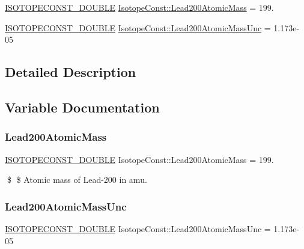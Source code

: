 \begin{DoxyCompactItemize}
\item 
\mbox{\hyperlink{group___isotope_const-_macros_ga8f45a7272ce02c0b4c65c44636ed719a}{I\+S\+O\+T\+O\+P\+E\+C\+O\+N\+S\+T\+\_\+\+D\+O\+U\+B\+LE}} \mbox{\hyperlink{group___isotope_const-_lead-_pb200_ga933e3948b76ac36aeda8444a6b076cfa}{Isotope\+Const\+::\+Lead200\+Atomic\+Mass}} = 199.
\item 
\mbox{\hyperlink{group___isotope_const-_macros_ga8f45a7272ce02c0b4c65c44636ed719a}{I\+S\+O\+T\+O\+P\+E\+C\+O\+N\+S\+T\+\_\+\+D\+O\+U\+B\+LE}} \mbox{\hyperlink{group___isotope_const-_lead-_pb200_gaf554846647b37135639dd9cd48b376ed}{Isotope\+Const\+::\+Lead200\+Atomic\+Mass\+Unc}} = 1.\+173e-\/05
\end{DoxyCompactItemize}


\subsection{Detailed Description}


\subsection{Variable Documentation}
\mbox{\label{group___isotope_const-_lead-_pb200_ga933e3948b76ac36aeda8444a6b076cfa}} 
\subsubsection{\texorpdfstring{Lead200\+Atomic\+Mass}{Lead200AtomicMass}}
{\footnotesize\ttfamily \mbox{\hyperlink{group___isotope_const-_macros_ga8f45a7272ce02c0b4c65c44636ed719a}{I\+S\+O\+T\+O\+P\+E\+C\+O\+N\+S\+T\+\_\+\+D\+O\+U\+B\+LE}} Isotope\+Const\+::\+Lead200\+Atomic\+Mass = 199.}

\$ \$ Atomic mass of Lead-\/200 in amu. \mbox{\label{group___isotope_const-_lead-_pb200_gaf554846647b37135639dd9cd48b376ed}} 
\subsubsection{\texorpdfstring{Lead200\+Atomic\+Mass\+Unc}{Lead200AtomicMassUnc}}
{\footnotesize\ttfamily \mbox{\hyperlink{group___isotope_const-_macros_ga8f45a7272ce02c0b4c65c44636ed719a}{I\+S\+O\+T\+O\+P\+E\+C\+O\+N\+S\+T\+\_\+\+D\+O\+U\+B\+LE}} Isotope\+Const\+::\+Lead200\+Atomic\+Mass\+Unc = 1.\+173e-\/05}

